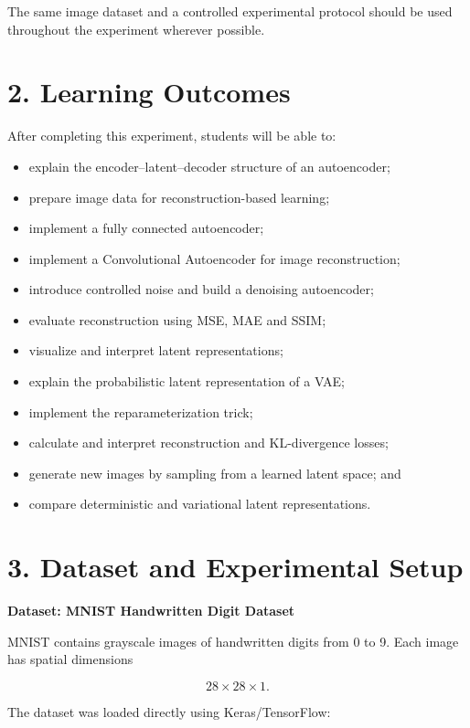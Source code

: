 \documentclass[10pt]{article}
\begin{document}
The same image dataset and a controlled experimental protocol should be used
throughout the experiment wherever possible.

\section*{2. Learning Outcomes}

After completing this experiment, students will be able to:

\begin{itemize}
\item explain the encoder--latent--decoder structure of an autoencoder;
\item prepare image data for reconstruction-based learning;
\item implement a fully connected autoencoder;
\item implement a Convolutional Autoencoder for image reconstruction;
\item introduce controlled noise and build a denoising autoencoder;
\item evaluate reconstruction using MSE, MAE and SSIM;
\item visualize and interpret latent representations;
\item explain the probabilistic latent representation of a VAE;
\item implement the reparameterization trick;
\item calculate and interpret reconstruction and KL-divergence losses;
\item generate new images by sampling from a learned latent space; and
\item compare deterministic and variational latent representations.
\end{itemize}

\section*{3. Dataset and Experimental Setup}

\textbf{Dataset: MNIST Handwritten Digit Dataset}

MNIST contains grayscale images of handwritten digits from 0 to 9. Each image
has spatial dimensions

\[
28\times28\times1.
\]

The dataset was loaded directly using Keras/TensorFlow:
\end{document}
